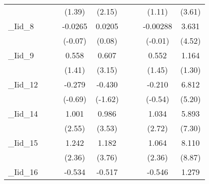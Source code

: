 {\begin{tabular}{l*{8}{c}}
            &                     &                     &      (1.39)         &      (2.15)         &                     &                     &      (1.11)         &      (3.61)         \\
[1em]
\_Iid\_8      &                     &                     &     -0.0265         &      0.0205         &                     &                     &    -0.00288         &       3.631\sym{***}\\
            &                     &                     &     (-0.07)         &      (0.08)         &                     &                     &     (-0.01)         &      (4.52)         \\
[1em]
\_Iid\_9      &                     &                     &       0.558         &       0.607\sym{**} &                     &                     &       0.552         &       1.164         \\
            &                     &                     &      (1.41)         &      (3.15)         &                     &                     &      (1.45)         &      (1.30)         \\
[1em]
\_Iid\_12     &                     &                     &      -0.279         &      -0.430         &                     &                     &      -0.210         &       6.812\sym{***}\\
            &                     &                     &     (-0.69)         &     (-1.62)         &                     &                     &     (-0.54)         &      (5.20)         \\
[1em]
\_Iid\_14     &                     &                     &       1.001\sym{*}  &       0.986\sym{***}&                     &                     &       1.034\sym{**} &       5.893\sym{***}\\
            &                     &                     &      (2.55)         &      (3.53)         &                     &                     &      (2.72)         &      (7.30)         \\
[1em]
\_Iid\_15     &                     &                     &       1.242\sym{*}  &       1.182\sym{***}&                     &                     &       1.064\sym{*}  &       8.110\sym{***}\\
            &                     &                     &      (2.36)         &      (3.76)         &                     &                     &      (2.36)         &      (8.87)         \\
[1em]
\_Iid\_16     &                     &                     &      -0.534         &      -0.517\sym{*}  &                     &                     &      -0.546         &       1.279         \\

\end{tabular}}
